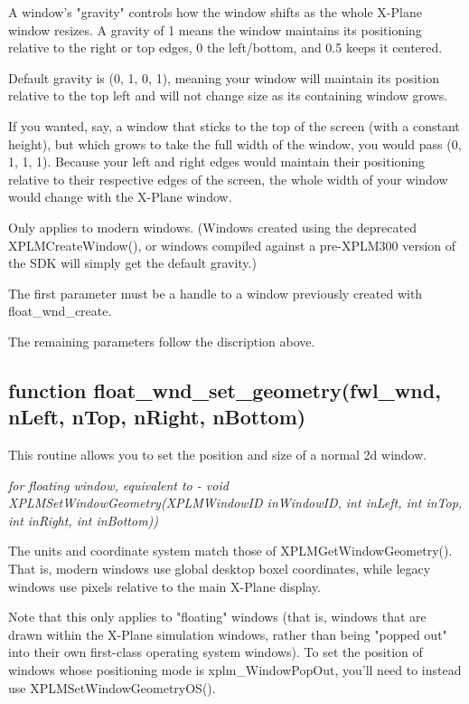 \documentclass[11pt,parskip=half,a4paper]{scrartcl}
\begin{document}
A window's "gravity" controls how the window shifts as the whole X-Plane window resizes. A gravity of 1 means the window maintains its positioning relative to the right or top edges, 0 the left/bottom, and 0.5 keeps it centered.

Default gravity is (0, 1, 0, 1), meaning your window will maintain its position relative to the top left and will not change size as its containing window grows.

If you wanted, say, a window that sticks to the top of the screen (with a constant height), but which grows to take the full width of the window, you would pass (0, 1, 1, 1). Because your left and right edges would maintain their positioning relative to their respective edges of the screen, the whole width of your window would change with the X-Plane window.

Only applies to modern windows. (Windows created using the deprecated XPLMCreateWindow(), or windows compiled against a pre-XPLM300 version of the SDK will simply get the default gravity.) 


The first parameter must be a handle to a window previously created with float\_wnd\_create.

The remaining parameters follow the discription above.

\subsection{\hspace*{1.0mm}function float\_wnd\_set\_geometry(fwl\_wnd, nLeft, nTop, nRight, nBottom)}

This routine allows you to set the position and size of a normal 2d window.

\emph{for floating window, equivalent to - void XPLMSetWindowGeometry(XPLMWindowID inWindowID, int inLeft, int inTop, int inRight, int inBottom))}

The units and coordinate system match those of XPLMGetWindowGeometry(). That is, modern windows use global desktop boxel coordinates, while legacy windows use pixels relative to the main X-Plane display.

Note that this only applies to "floating" windows (that is, windows that are drawn within the X-Plane simulation windows, rather than being "popped out" into their own first-class operating system windows). To set the position of windows whose positioning mode is xplm\_WindowPopOut, you'll need to instead use XPLMSetWindowGeometryOS().
\end{document}
